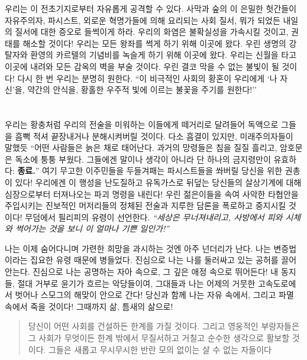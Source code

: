 \documentclass[10pt, b6paper, openany]{memoir}
\begin{document}
\begin{article}
우리는 이 전초기지로부터 자유롭게 공격할 수 있다. 사막과 숲의 이 은밀한 헛간들이 자유주의자, 파시스트, 외로운 혁명가들에 의해 요리되는 사회 질서, 뭐가 되었든 내일의 질서에 대한 증오로 들썩이게 하라. 우리의 화염은 불확실성을 가속시킬 것이고, 권태를 해소할 것이다! 우리는 모든 왕좌를 썩게 하기 위해 이곳에 왔다. 우린 생명의 강탈자와 환영의 카르텔의 기념비를 녹슬게 하기 위해 이곳에 왔다. 우리는 신월을 타고 이곳에 내려와 모든 감옥의 벽을 부술 것이다. 우린 결코 막을 수 없는 불빛이 될 것이다! 다시 한 번 우리는 분명히 원한다. ``이 비극적인 사회의 황혼이 우리에게 `나 자신'을, 약간의 안식을, 황홀한 우주적 빛에 이르는 불꽃을 주기를 원한다!''\parencite{ibk:renzo2012}

\section{}

우리는 황충처럼 우리의 전술을 미워하는 이들에게 떼거리로 달려들어 독액으로 그들을 흠뻑 적셔 끝장내거나 분해시켜버릴 것이다. 다소 흠결이 있지만, 미래주의자들이 말했듯 ``어떤 사람들은 늙은 채로 태어난다. 과거의 망령들은 침을 질질 흘리고, 암호문은 독소에 퉁퉁 부웠다. 그들에겐 말이나 생각이 아니라 단 하나의 금지령만이 유효하다: \textbf{종료.}''\parencite{atcl:francesco1910} 여기 무고한 이주민들을 두들겨패는 파시스트들을 쏴버릴 당신을 위한 권총이 있다! 우리에겐 이 행성을 난도질하고 유독가스로 뒤덮는 당신들의 살상기계에 대해 심장으로부터 터져나오는 파괴 명령을 내린다! 우린 젊은이들을 속여 사악한 타협안을 주입시키는 진보적인 머저리들의 정체된 전술과 지루한 담론을 폭로하고 중지시킬 것이다! 무덤에서 필리피의 유령이 선언한다. \textit{``세상은 무너져내리고, 사방에서 피와 시체와 썩어가는 것을 보니 이 얼마나 기쁜 일인가!''\parencite{ibk:bruno2008}}

나는 이제 숨어다니며 가련한 희망을 과시하는 것엔 아주 넌더리가 난다. 나는 변증법이라는 집요한 유령 때문에 병들었다. 진심으로 나는 나를 둘러싸고 있는 공허를 끌어안는다. 진심으로 나는 공명하는 자아 속으로, 그 깊은 애정 속으로 뛰어든다! 내 동지들, 절대 거부로 윤기가 흐르는 악당들이여, 그대들과 나는 어제의 거뭇한 고속도로에서 벗어나 스모그의 해맞이 안으로 간다! 당신과 함께 나는 자유 속에서, 그리고 파멸 속에서 죽을 것이다! 그때까지 삶, 틈새의 삶으로! 

\begin{quote}
당신이 어떤 사회를 건설하든 한계를 가질 것이다. 그리고 영웅적인 부랑자들은 그 사회가 무엇이든 한계 밖에서 무질서하고 거칠고 순수한 생각으로 활보할 것이다. 그들은 새롭고 무시무시한 반란 모의 없이는 살 수 없는 자들이다


\end{quote}
\end{article}
\end{document}
